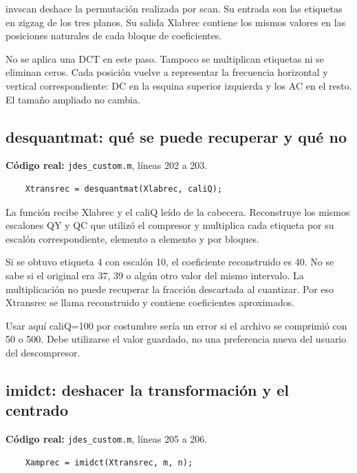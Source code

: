 \documentclass[11pt,a4paper,oneside]{report}
\begin{document}
invscan deshace la permutación realizada por scan. Su entrada son las etiquetas
en zigzag de los tres planos. Su salida Xlabrec contiene los mismos valores
en las posiciones naturales de cada bloque de coeficientes.

No se aplica una DCT en este paso. Tampoco se multiplican etiquetas ni se
eliminan ceros. Cada posición vuelve a representar la frecuencia horizontal
y vertical correspondiente: DC en la esquina superior izquierda y los AC
en el resto. El tamaño ampliado no cambia.


\par\medskip\noindent\begin{minipage}{\linewidth}

\subsection{desquantmat: qué se puede recuperar y qué no}

\textbf{Código real:} \texttt{jdes\_custom.m}, líneas 202 a 203.

\begin{lstlisting}[firstnumber=202]
    % PASO 10: descuantizar las etiquetas.
    Xtransrec = desquantmat(Xlabrec, caliQ);
\end{lstlisting}

\end{minipage}\par


La función recibe Xlabrec y el caliQ leído de la cabecera. Reconstruye los
mismos escalones QY y QC que utilizó el compresor y multiplica cada etiqueta
por su escalón correspondiente, elemento a elemento y por bloques.

Si se obtuvo etiqueta 4 con escalón 10, el coeficiente reconstruido es 40.
No se sabe si el original era 37, 39 o algún otro valor del mismo intervalo.
La multiplicación no puede recuperar la fracción descartada al cuantizar.
Por eso Xtransrec se llama reconstruido y contiene coeficientes aproximados.

Usar aquí caliQ=100 por costumbre sería un error si el archivo se comprimió
con 50 o 500. Debe utilizarse el valor guardado, no una preferencia nueva
del usuario del descompresor.


\par\medskip\noindent\begin{minipage}{\linewidth}

\subsection{imidct: deshacer la transformación y el centrado}

\textbf{Código real:} \texttt{jdes\_custom.m}, líneas 205 a 206.

\begin{lstlisting}[firstnumber=205]
    % PASO 11: aplicar la DCT inversa.
    Xamprec = imidct(Xtransrec, m, n);
\end{lstlisting}

\end{minipage}\par
\end{document}
